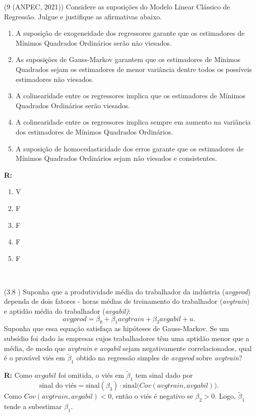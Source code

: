 \documentclass[12pt,letterpaper, onecolumn]{exam}
\renewenvironment{solution}
  {\par\noindent\textbf{R:}\enspace\color{blue}}
  {\par\color{black}}
\begin{document}
\begin{questions}

    \question (9 (ANPEC, 2021)) Considere as suposições do Modelo Linear Clássico de Regressão. Julgue e justifique as afirmativas abaixo.
    \begin{enumerate}[label=(\arabic*), start=0]
    \item A suposição de exogeneidade dos regressores garante que os estimadores de Mínimos Quadrados Ordinários serão não viesados.
    \item As suposições de Gauss-Markov garantem que os estimadores de Mínimos Quadrados sejam os estimadores de menor variância dentre todos os possíveis estimadores não viesados.
    \item A colinearidade entre os regressores implica que os estimadores de Mínimos Quadrados Ordinários serão viesados.
    \item A colinearidade entre os regressores implica sempre em aumento na variância dos estimadores de Mínimos Quadrados Ordinários.
    \item A suposição de homocedasticidade dos erros garante que os estimadores de Mínimos Quadrados Ordinários sejam não viesados e consistentes.
    \end{enumerate}
    \begin{solution}
\begin{enumerate}[label=(\arabic*), start=0]
    \item V
    \item F
    \item F
    \item F
    \item F
\end{enumerate}
\end{solution}
\
\


    
    \question\qstar (3.8 \citep{wooldridge2016}) Suponha que a produtividade média do trabalhador da indústria (\textit{avgprod}) dependa de dois fatores - horas médias de treinamento do trabalhador (\textit{avgtrain}) e aptidão média do trabalhador (\textit{avgabil)}:\begin{equation*}
        avgprod = \beta_0 + \beta_1avgtrain + \beta_3 avgabil + u\text{.}
    \end{equation*}Suponha que essa equação satisfaça as hipóteses de Gauss-Markov. Se um subsídio foi dado às empresas cujos trabalhadores têm uma aptidão menor que a média, de modo que \textit{avgtrain} e \textit{avgabil} sejam negativamente correlacionados, qual é o provável viés em $\tilde\beta_1$ obtido na regressão simples de \textit{avgprod} sobre \textit{avgtrain}?
    \begin{solution}
Como \(avgabil\) foi omitida, o viés em \(\tilde\beta_1\) tem sinal dado por
\[
\text{sinal do viés} = \text{sinal}(\beta_3)\cdot \text{sinal}\big(Cov(avgtrain,avgabil)\big).
\]
Como \(Cov(avgtrain,avgabil)<0\), então o viés é negativo se \(\beta_2>0\). Logo, \(\tilde\beta_1\) tende a subestimar \(\beta_1\).
\end{solution}



\end{questions}
\end{document}
